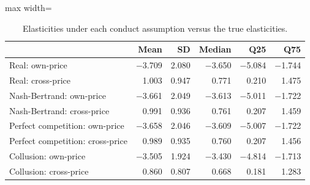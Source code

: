 \begin{table}[H]
\centering\small
\caption{Elasticities under each conduct assumption versus the true elasticities.}\label{tab:q9e_elas}
\begin{adjustbox}{max width=\linewidth}
\begin{tabular}{lrrrrr}
\toprule
 & Mean & SD & Median & Q25 & Q75 \\
\midrule
Real: own-price & $-$3.709 & 2.080 & $-$3.650 & $-$5.084 & $-$1.744 \\
Real: cross-price & 1.003 & 0.947 & 0.771 & 0.210 & 1.475 \\
Nash-Bertrand: own-price & $-$3.661 & 2.049 & $-$3.613 & $-$5.011 & $-$1.722 \\
Nash-Bertrand: cross-price & 0.991 & 0.936 & 0.761 & 0.207 & 1.459 \\
Perfect competition: own-price & $-$3.658 & 2.046 & $-$3.609 & $-$5.007 & $-$1.722 \\
Perfect competition: cross-price & 0.989 & 0.935 & 0.760 & 0.207 & 1.456 \\
Collusion: own-price & $-$3.505 & 1.924 & $-$3.430 & $-$4.814 & $-$1.713 \\
Collusion: cross-price & 0.860 & 0.807 & 0.668 & 0.181 & 1.283 \\
\bottomrule
\end{tabular}
\end{adjustbox}
\par\vspace{3pt}{\footnotesize Own- and cross-price elasticities pooled over the 100 markets and 3 products (300 own, 600 cross).}
\end{table}
